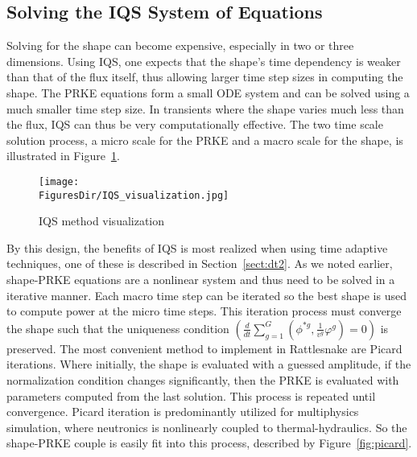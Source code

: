 \documentclass[12pt]{scrartcl}
\newcommand{\fig}[1]{Figure~\ref{#1}}                      %
\newcommand{\sct}[1]{Section~\ref{#1}}                   %
\newcommand{\FiguresDir}{./figs}
\begin{document}
\subsection{Solving the IQS System of Equations}

Solving for the shape can become expensive, especially in two or three dimensions.  Using IQS, one expects that the shape's time dependency is weaker than that of the flux itself,  thus allowing larger time step sizes in computing the shape. The PRKE equations form a small ODE system and can be solved using a much smaller time step size. In transients where the shape varies much less than the flux, IQS can thus be very computationally effective. The two time scale solution process, a micro scale for the PRKE and a macro scale for the shape, is illustrated in \fig{fig:iqsviz}.

\begin{figure}[!htbp]
\texttt{[image: \\FiguresDir/IQS\_visualization.jpg]}
\caption{IQS method visualization}
\label{fig:iqsviz}
\end{figure}

By this design, the benefits of IQS is most realized when using time adaptive techniques, one of these is described in  \sct{sect:dt2}.  As we noted earlier, shape-PRKE equations are a nonlinear system and thus need to be solved in a iterative manner.  Each macro time step can be iterated so the best shape is used to compute power at the micro time steps.  This iteration process must converge the shape such that the uniqueness condition $(\frac{d}{dt}\sum_{g=1}^G\left(\phi^{*g},\frac{1}{v^g}\varphi^g\right)=0)$ is preserved.  The most convenient method to implement in Rattlesnake are Picard iterations.  Where initially, the shape is evaluated with a guessed amplitude, if the normalization condition changes significantly, then the PRKE is evaluated with parameters computed from the last solution.  This process is repeated until convergence.  Picard iteration is predominantly utilized for multiphysics simulation, where neutronics is nonlinearly coupled to thermal-hydraulics.  So the shape-PRKE couple is easily fit into this process, described by \fig{fig:picard}.
\end{document}

